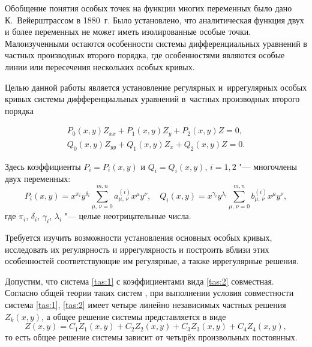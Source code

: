 Обобщение понятия особых точек на функции многих переменных было дано К.~Вейерштрассом в 1880~г. 
Было установлено, что аналитическая функция двух и более переменных не может иметь изолированные
особые точки. 
Малоизученными остаются особенности системы дифференциальных уравнений в частных производных второго порядка, где особенностями являются особые линии или пересечения нескольких особых кривых.

Целью данной работы является установление регулярных и~иррегулярных особых кривых системы дифференциальных уравнений в~частных производных второго порядка

\begin{equation}
\begin{array}{l}
P_{0}(x,y)   Z_{xx}+P_{1}(x,y)   Z_{y}+P_{2}(x,y)   Z=0, \\
Q_{0}(x,y)   Z_{yy}+Q_{1}(x,y)   Z_{x}+Q_{2}(x,y)   Z=0.
\end{array} 
\label{tas:1}
\end{equation}

\noindent
Здесь коэффициенты $P_{i}=P_{i}(x,y)$ и $Q_{i}=Q_{i}(x,y)$, $i=1, 2$ "--- многочлены двух переменных:
\begin{equation}
P_{i}(x,y)=x^{\pi_{i}}   y^{\delta_{i}}   \displaystyle
\sum_{\mu,\,\nu=0}^{m,n} a_{\mu,\,\nu}^{(i)}   x^{\mu}  
y^{\nu}, \quad 
Q_{i}(x,y)=x^{\gamma_{i}}   y^{\lambda_{i}}   \displaystyle
\sum_{\mu,\,\nu=0}^{m,n} b_{\mu,\,\nu}^{(i)}   x^{\mu}  
y^{\nu},
\label{tas:2}
\end{equation}
где
$\pi_{i}$, $\delta_{i}$, $\gamma_{i}$, $\lambda_{i}$  "--- целые неотрицательные числа.

Требуется изучить возможности установления основных особых кривых,
исследовать их регулярность и иррегулярность  и построить вблизи этих
особенностей соответствующие им регулярные, а также иррегулярные
решения.

Допустим, что система \eqref{tas:1} с коэффициентами вида \eqref{tas:2} совместная.
Согласно общей теории таких систем \cite{tas:bib:5}, при выполнении условия
совместности система \eqref{tas:1}, \eqref{tas:2} имеет четыре линейно независимых
частных решения $Z_{k}(x,y)$,  а общее решение
системы представляется в виде
\begin{equation}
Z(x,y)=C_{1}   Z_{1}(x,y)+C_{2}   Z_{2}(x,y)+C_{3}  
Z_{3}(x,y)+C_{4}   Z_{4}(x,y),
\label{tas:3}
\end{equation}
то есть общее решение системы зависит от четырёх произвольных
постоянных.

